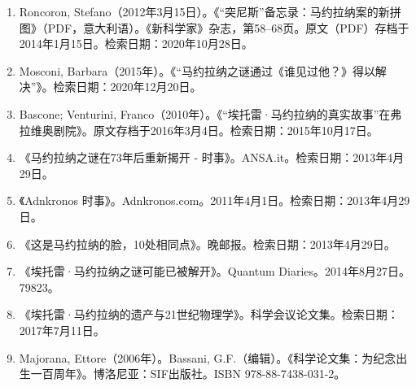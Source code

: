 \begin{enumerate}
\item Roncoron, Stefano（2012年3月15日）。《“突尼斯”备忘录：马约拉纳案的新拼图》（PDF，意大利语）。《新科学家》杂志，第58–68页。原文（PDF）存档于2014年1月15日。检索日期：2020年10月28日。
\item Mosconi, Barbara（2015年）。《“马约拉纳之谜通过《谁见过他？》得以解决”》。检索日期：2020年12月20日。
\item Bascone; Venturini, Franco（2010年）。《“埃托雷·马约拉纳的真实故事”在弗拉维奥剧院》。原文存档于2016年3月4日。检索日期：2015年10月17日。
\item 《马约拉纳之谜在73年后重新揭开 - 时事》。ANSA.it。检索日期：2013年4月29日。
\item 《Adnkronos 时事》。Adnkronos.com。2011年4月1日。检索日期：2013年4月29日。
\item 《这是马约拉纳的脸，10处相同点》。晚邮报。检索日期：2013年4月29日。
\item 《埃托雷·马约拉纳之谜可能已被解开》。Quantum Diaries。2014年8月27日。79823。
\item 《埃托雷·马约拉纳的遗产与21世纪物理学》。科学会议论文集。检索日期：2017年7月11日。
\item Majorana, Ettore（2006年）。Bassani, G.F.（编辑）。《科学论文集：为纪念出生一百周年》。博洛尼亚：SIF出版社。ISBN 978-88-7438-031-2。
\end{enumerate}
